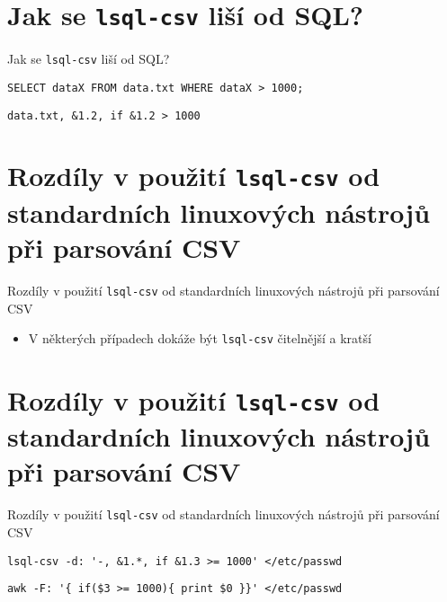 \documentclass{beamer}
\def\icode#1{\texttt{#1}}
\begin{document}
\section{Jak se \icode{lsql-csv} liší od SQL?}
\begin{frame}[fragile]{Jak se \icode{lsql-csv} liší od SQL?}
\begin{verbatim}
SELECT dataX FROM data.txt WHERE dataX > 1000;
\end{verbatim}

\vskip 1cm

\begin{verbatim}
data.txt, &1.2, if &1.2 > 1000
\end{verbatim}

\end{frame}


\section{Rozdíly v použití \icode{lsql-csv} od standardních linuxových nástrojů při parsování CSV}
\begin{frame}[fragile]{Rozdíly v použití \icode{lsql-csv} od standardních linuxových nástrojů při parsování CSV}
\begin{itemize}
\item V některých případech dokáže být \icode{lsql-csv} čitelnější a kratší
\end{itemize}
\end{frame}


\section{Rozdíly v použití \icode{lsql-csv} od standardních linuxových nástrojů při parsování CSV}
\begin{frame}[fragile]{Rozdíly v použití \icode{lsql-csv} od standardních linuxových nástrojů při parsování CSV}

\begin{verbatim}
lsql-csv -d: '-, &1.*, if &1.3 >= 1000' </etc/passwd
\end{verbatim}

\vskip 1cm

\begin{verbatim}
awk -F: '{ if($3 >= 1000){ print $0 }}' </etc/passwd
\end{verbatim}
\end{frame}
\end{document}
